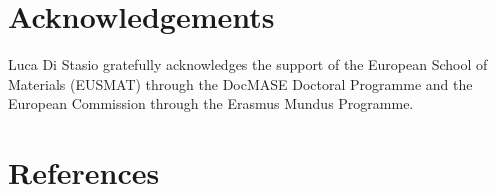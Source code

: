 
\section*{Acknowledgements}

Luca Di Stasio gratefully acknowledges the support of the European School of Materials (EUSMAT) through the DocMASE Doctoral Programme and the European Commission through the Erasmus Mundus Programme.


\section*{References}
\printbibliography[heading=none]
